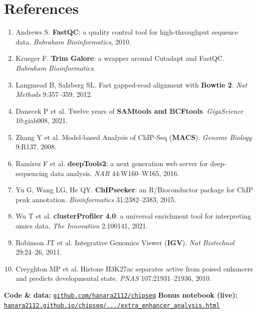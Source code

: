 \documentclass[11pt,a4paper]{article}
\newcommand{\repourl}{https://github.com/hanara2112/chipseq.git}
\newcommand{\notebookurl}{https://hanara2112.github.io/chipseq/docs/extra_enhancer_analysis.html}
\begin{document}
\section*{References}
\footnotesize
\begin{enumerate}\setlength\itemsep{0pt}
\item Andrews S. \textbf{FastQC}: a quality control tool for high-throughput sequence data. \emph{Babraham Bioinformatics}, 2010.
\item Krueger F. \textbf{Trim Galore}: a wrapper around Cutadapt and FastQC. \emph{Babraham Bioinformatics}.
\item Langmead B, Salzberg SL. Fast gapped-read alignment with \textbf{Bowtie 2}. \emph{Nat Methods} 9:357--359, 2012.
\item Danecek P et al. Twelve years of \textbf{SAMtools and BCFtools}. \emph{GigaScience} 10:giab008, 2021.
\item Zhang Y et al. Model-based Analysis of ChIP-Seq (\textbf{MACS}). \emph{Genome Biology} 9:R137, 2008.
\item Ramírez F et al. \textbf{deepTools2}: a next generation web server for deep-sequencing data analysis. \emph{NAR} 44:W160--W165, 2016.
\item Yu G, Wang LG, He QY. \textbf{ChIPseeker}: an R/Bioconductor package for ChIP peak annotation. \emph{Bioinformatics} 31:2382--2383, 2015.
\item Wu T et al. \textbf{clusterProfiler 4.0}: a universal enrichment tool for interpreting omics data. \emph{The Innovation} 2:100141, 2021.
\item Robinson JT et al. Integrative Genomics Viewer (\textbf{IGV}). \emph{Nat Biotechnol} 29:24--26, 2011.
\item Creyghton MP et al. Histone H3K27ac separates active from poised enhancers and predicts developmental state. \emph{PNAS} 107:21931--21936, 2010.
\end{enumerate}

\vspace{0.4em}
\noindent\textbf{Code \& data:} \href{\repourl}{\texttt{github.com/hanara2112/chipseq}} \; \textbar\; \textbf{Bonus notebook (live):} \href{\notebookurl}{\texttt{hanara2112.github.io/chipseq/.../extra\_enhancer\_analysis.html}}
\end{document}
